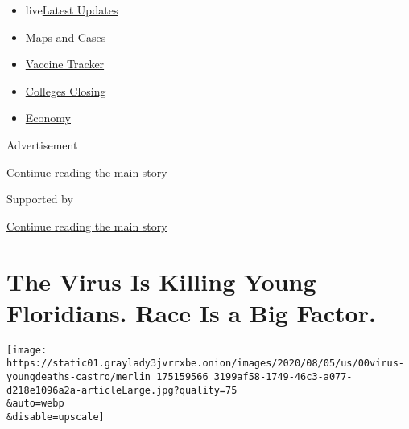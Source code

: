 \begin{itemize}
\tightlist
\item
  live\href{https://www.nytimes3xbfgragh.onion/2020/08/20/world/coronavirus-covid.html?name=styln-coronavirus-national\&region=TOP_BANNER\&variant=undefined\&block=storyline_menu_recirc\&action=click\&pgtype=Article\&impression_id=c3e64bb1-e375-11ea-9198-f319f806a34f}{Latest
  Updates}
\item
  \href{https://www.nytimes3xbfgragh.onion/interactive/2020/us/coronavirus-us-cases.html?name=styln-coronavirus-national\&region=TOP_BANNER\&variant=undefined\&block=storyline_menu_recirc\&action=click\&pgtype=Article\&impression_id=c3e64bb2-e375-11ea-9198-f319f806a34f}{Maps
  and Cases}
\item
  \href{https://www.nytimes3xbfgragh.onion/interactive/2020/science/coronavirus-vaccine-tracker.html?name=styln-coronavirus-national\&region=TOP_BANNER\&variant=undefined\&block=storyline_menu_recirc\&action=click\&pgtype=Article\&impression_id=c3e64bb3-e375-11ea-9198-f319f806a34f}{Vaccine
  Tracker}
\item
  \href{https://www.nytimes3xbfgragh.onion/2020/08/19/us/colleges-closing-covid.html?name=styln-coronavirus-national\&region=TOP_BANNER\&variant=undefined\&block=storyline_menu_recirc\&action=click\&pgtype=Article\&impression_id=c3e64bb4-e375-11ea-9198-f319f806a34f}{Colleges
  Closing}
\item
  \href{https://www.nytimes3xbfgragh.onion/live/2020/08/20/business/stock-market-today-coronavirus?name=styln-coronavirus-national\&region=TOP_BANNER\&variant=undefined\&block=storyline_menu_recirc\&action=click\&pgtype=Article\&impression_id=c3e672c0-e375-11ea-9198-f319f806a34f}{Economy}
\end{itemize}

Advertisement

\protect\hyperlink{after-top}{Continue reading the main story}

Supported by

\protect\hyperlink{after-sponsor}{Continue reading the main story}

\hypertarget{the-virus-is-killing-young-floridians-race-is-a-big-factor}{%
\section{The Virus Is Killing Young Floridians. Race Is a Big
Factor.}\label{the-virus-is-killing-young-floridians-race-is-a-big-factor}}

\texttt{[image: https://static01.graylady3jvrrxbe.onion/images/2020/08/05/us/00virus-youngdeaths-castro/merlin\_175159566\_3199af58-1749-46c3-a077-d218e1096a2a-articleLarge.jpg?quality=75\\\&auto=webp\\\&disable=upscale]}

